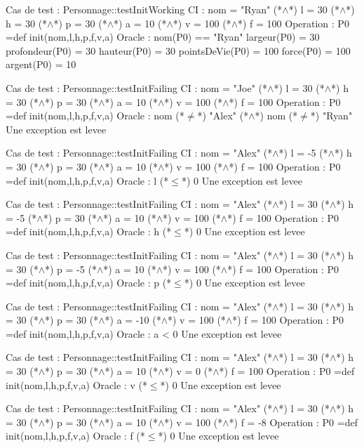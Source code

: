 \documentclass[a4paper, 11pt, notitlepage]{report}
\begin{document}
\begin{Test}
Cas de test : Personnage::testInitWorking
CI : nom = "Ryan" (*$\land$*) l = 30 (*$\land$*) h = 30 (*$\land$*) p = 30 (*$\land$*) a = 10 (*$\land$*) v = 100 (*$\land$*) f = 100
Operation : P0 =def init(nom,l,h,p,f,v,a)
Oracle : 
	nom(P0) == "Ryan"
	largeur(P0) =	30
	profondeur(P0) = 30
	hauteur(P0) = 30
	pointsDeVie(P0) = 100
	force(P0) = 100
	argent(P0) = 10
	
	
Cas de test : Personnage::testInitFailing 
CI : nom = "Joe" (*$\land$*) l = 30 (*$\land$*) h = 30 (*$\land$*) p = 30 (*$\land$*) a = 10 (*$\land$*) v = 100 (*$\land$*) f = 100
Operation : P0 =def init(nom,l,h,p,f,v,a)
Oracle : 
	nom (*$\ne$*) "Alex" (*$\land$*) nom (*$\ne$*) "Ryan"
	Une exception est levee
	
Cas de test : Personnage::testInitFailing 
CI : nom = "Alex" (*$\land$*) l = -5 (*$\land$*) h = 30 (*$\land$*) p = 30 (*$\land$*) a = 10 (*$\land$*) v = 100 (*$\land$*) f = 100
Operation : P0 =def init(nom,l,h,p,f,v,a)
Oracle : 
	l (*$\leq$*) 0
	Une exception est levee
	
Cas de test : Personnage::testInitFailing 
CI : nom = "Alex" (*$\land$*) l = 30 (*$\land$*) h = -5 (*$\land$*) p = 30 (*$\land$*) a = 10 (*$\land$*) v = 100 (*$\land$*) f = 100
Operation : P0 =def init(nom,l,h,p,f,v,a)
Oracle : 
	h (*$\leq$*) 0
	Une exception est levee
	
Cas de test : Personnage::testInitFailing 
CI : nom = "Alex" (*$\land$*) l = 30 (*$\land$*) h = 30 (*$\land$*) p = -5 (*$\land$*) a = 10 (*$\land$*) v = 100 (*$\land$*) f = 100
Operation : P0 =def init(nom,l,h,p,f,v,a)
Oracle : 
	p (*$\leq$*) 0
	Une exception est levee
	
Cas de test : Personnage::testInitFailing 
CI : nom = "Alex" (*$\land$*) l = 30 (*$\land$*) h = 30 (*$\land$*) p = 30 (*$\land$*) a = -10 (*$\land$*) v = 100 (*$\land$*) f = 100
Operation : P0 =def init(nom,l,h,p,f,v,a)
Oracle : 
	a < 0
	Une exception est levee
	
Cas de test : Personnage::testInitFailing 
CI : nom = "Alex" (*$\land$*) l = 30 (*$\land$*) h = 30 (*$\land$*) p = 30 (*$\land$*) a = 10 (*$\land$*) v = 0 (*$\land$*) f = 100
Operation : P0 =def init(nom,l,h,p,f,v,a)
Oracle : 
	v (*$\leq$*) 0
	Une exception est levee
	
Cas de test : Personnage::testInitFailing 
CI : nom = "Alex" (*$\land$*) l = 30 (*$\land$*) h = 30 (*$\land$*) p
= 30 (*$\land$*) a = 10 (*$\land$*) v = 100 (*$\land$*) f = -8
Operation : P0 =def init(nom,l,h,p,f,v,a)
Oracle : 
	f (*$\leq$*) 0
	Une exception est levee


\end{Test}
\end{document}
